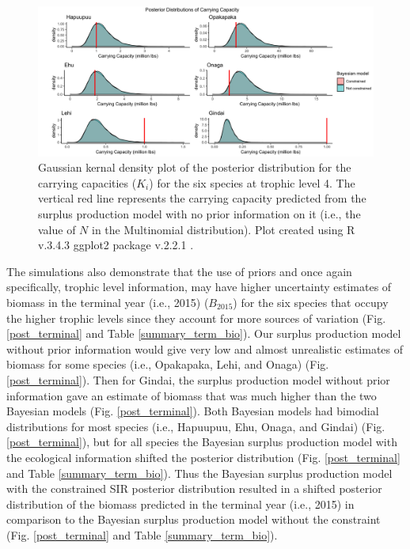 \documentclass[oneside,12pt,final]{sty/ucthesis-CA2012}
\let\cite\citep                             %
\begin{document}
\begin{mainmatter}
\begin{figure}[H]
     \centering
       \includegraphics[width=\textwidth]{fig/post_carrying}
    \caption{Gaussian kernal density plot of the posterior distribution for the carrying capacities ($K_i$) for the six species at trophic level 4. The vertical red line represents the carrying capacity predicted from the surplus production model with no prior information on it (i.e., the value of $N$ in the Multinomial distribution). Plot created using R v.3.4.3 \cite{Rcite} ggplot2 package v.2.2.1 \cite{ggplot}.}
    \label{post_carrying}
\end{figure}

The simulations also demonstrate that the use of priors and once again specifically, trophic level information, may have higher uncertainty estimates of biomass in the terminal year (i.e., 2015) ($B_{2015}$) for the six species that occupy the higher trophic levels since they account for more sources of variation (Fig. \ref{post_terminal} and Table \ref{summary_term_bio}). Our surplus production model without prior information would give very low and almost unrealistic estimates of biomass for some species (i.e.,  Opakapaka, Lehi, and Onaga) (Fig. \ref{post_terminal}). Then for Gindai, the surplus production model without prior information gave an estimate of biomass that was much higher than the two Bayesian models (Fig. \ref{post_terminal}). Both Bayesian models had bimodial distributions for most species (i.e., Hapuupuu, Ehu, Onaga, and Gindai) (Fig. \ref{post_terminal}), but for all species the Bayesian surplus production model with the ecological information shifted the posterior distribution (Fig. \ref{post_terminal} and Table \ref{summary_term_bio}). Thus the Bayesian surplus production model with the constrained SIR posterior distribution resulted in a shifted posterior distribution of the biomass predicted in the terminal year (i.e., 2015) in comparison to the Bayesian surplus production model without the constraint (Fig. \ref{post_terminal} and Table \ref{summary_term_bio}). 


\end{mainmatter}
\end{document}
